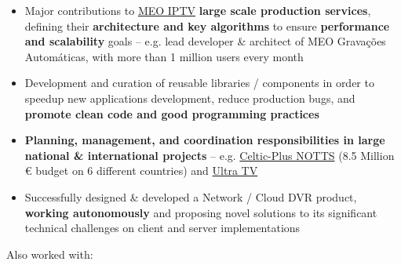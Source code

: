 \documentclass[10pt,a4paper]{altacv}
\begin{document}
\begin{itemize}
	\item Major contributions to \href{https://www.meo.pt/tv}{MEO IPTV} \textbf{large scale production services}, defining their \textbf{architecture and key algorithms} to ensure \textbf{performance and scalability} goals -- e.g. lead developer \& architect of MEO Gravações Automáticas, with more than 1 million users every month
	\item Development and curation of reusable libraries / components in order to speedup new applications development, reduce production bugs, and \textbf{promote clean code and good programming practices}
	\item \textbf{Planning, management, and coordination responsibilities in large national \& international projects} -- e.g. \href{http://www.alticelabs.com/gapott/}{Celtic-Plus NOTTS} (8.5 Million € budget on 6 different countries) and \href{http://www.alticelabs.com/site/ultratv/}{Ultra TV}
\end{itemize}

\divider


\begin{itemize}
\item Successfully designed \& developed a Network / Cloud DVR product, \textbf{working autonomously} and proposing novel solutions to its significant technical challenges on client and server implementations
\end{itemize}


    
   
    
           

\divider
Also worked with: \\
       
       
   
\end{document}
